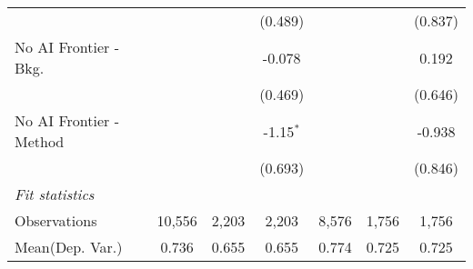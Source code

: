 \begin{tabular}{lcccccc}
                           &               &         & (0.489)     &               &         & (0.837)\\   
   No AI Frontier - Bkg.   &               &         & -0.078      &               &         & 0.192\\   
                           &               &         & (0.469)     &               &         & (0.646)\\   
   No AI Frontier - Method &               &         & -1.15$^{*}$ &               &         & -0.938\\   
                           &               &         & (0.693)     &               &         & (0.846)\\   
   \midrule
   \emph{Fit statistics}\\
   Observations            & 10,556        & 2,203   & 2,203       & 8,576         & 1,756   & 1,756\\  
Mean(Dep. Var.) & 0.736 & 0.655 & 0.655 & 0.774 & 0.725 & 0.725 \\
   

\end{tabular}
